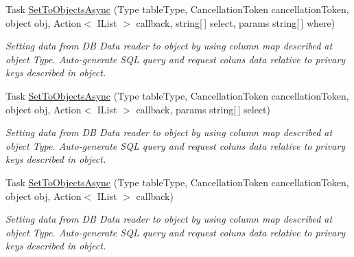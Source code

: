 \begin{DoxyCompactItemize}
Task \mbox{\hyperlink{interface_uniform_data_operator_1_1_sql_1_1_i_sql_operator_a396bf6c6d962ba910367755ad13d3d3c}{Set\+To\+Objects\+Async}} (Type table\+Type, Cancellation\+Token cancellation\+Token, object obj, Action$<$ I\+List $>$ callback, string\mbox{[}$\,$\mbox{]} select, params string\mbox{[}$\,$\mbox{]} where)
\begin{DoxyCompactList}\small\item\em Setting data from DB Data reader to object by using column map described at object Type. Auto-\/generate S\+QL query and request coluns data relative to privary keys described in object. \end{DoxyCompactList}\item 
Task \mbox{\hyperlink{interface_uniform_data_operator_1_1_sql_1_1_i_sql_operator_a277f97eaff18d7966e9b7ce00c171a0a}{Set\+To\+Objects\+Async}} (Type table\+Type, Cancellation\+Token cancellation\+Token, object obj, Action$<$ I\+List $>$ callback, params string\mbox{[}$\,$\mbox{]} select)
\begin{DoxyCompactList}\small\item\em Setting data from DB Data reader to object by using column map described at object Type. Auto-\/generate S\+QL query and request coluns data relative to privary keys described in object. \end{DoxyCompactList}\item 
Task \mbox{\hyperlink{interface_uniform_data_operator_1_1_sql_1_1_i_sql_operator_ac8deb4d7a21d382b352b401f714deea9}{Set\+To\+Objects\+Async}} (Type table\+Type, Cancellation\+Token cancellation\+Token, object obj, Action$<$ I\+List $>$ callback)
\begin{DoxyCompactList}\small\item\em Setting data from DB Data reader to object by using column map described at object Type. Auto-\/generate S\+QL query and request coluns data relative to privary keys described in object. \end{DoxyCompactList}\end{DoxyCompactItemize}
